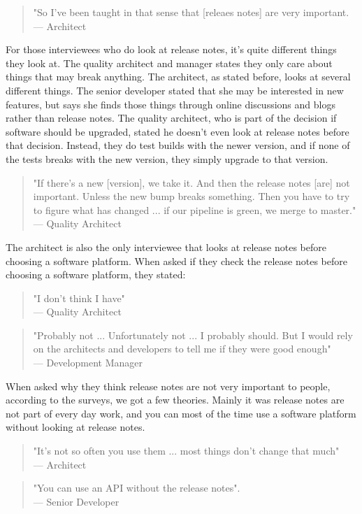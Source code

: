 \documentclass{article}
\begin{document}
\begin{quote}
"So I've been taught in that sense that [releaes notes] are very important. \\
--- Architect
\end{quote}
For those interviewees who do look at release notes, it's quite different things they look at. The quality architect and manager states they only care about things that may break anything. The architect, as stated before, looks at several different things. The senior developer stated that she may be interested in new features, but says she finds those things through online discussions and blogs rather than release notes. The quality architect, who is part of the decision if software should be upgraded, stated he doesn't even look at release notes before that decision. Instead, they do test builds with the newer version, and if none of the tests breaks with the new version, they simply upgrade to that version.
\begin{quote}
"If there's a new [version], we take it. And then the release notes [are] not important. Unless the new bump breaks something. Then you have  to try to figure what has changed ... if our pipeline is green, we merge to master."\\
--- Quality Architect
\end{quote}
The architect is also the only interviewee that looks at release notes before choosing a software platform.  When asked if they check the release notes before choosing a software platform, they stated:
\begin{quote}
"I don't think I have"\\
--- Quality Architect
\end{quote}
\begin{quote}
"Probably not ... Unfortunately not ... I probably should. But I would rely on the architects and developers to tell me if they were good enough" \\
--- Development Manager
\end{quote}
When asked why they think release notes are not very important to people, according to the surveys, we got a few theories. Mainly it was release notes are not part of every day work, and you can most of the time use a software platform without looking at release notes.
\begin{quote}
"It's not so often you use them ... most things don't change that much" \\
--- Architect
\end{quote}
\begin{quote}
"You can use an API without the release notes".\\
--- Senior Developer
\end{quote}
\end{document}
